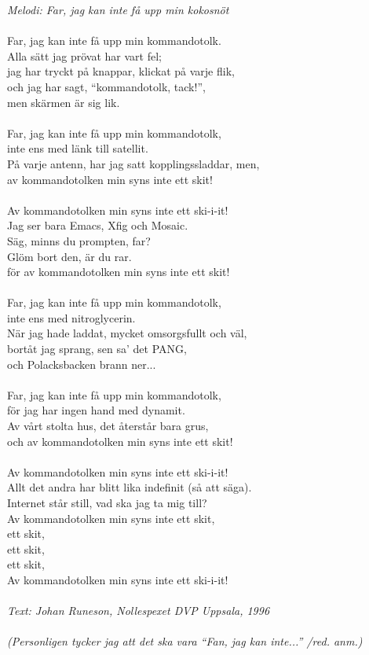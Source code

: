 {\footnotesize\textit{Melodi: Far, jag kan inte få upp min kokosnöt}}\\
\\
Far, jag kan inte få upp min kommandotolk.\\
Alla sätt jag prövat har vart fel;\\
jag har tryckt på knappar, klickat på varje flik,\\
och jag har sagt, “kommandotolk, tack!”,\\
men skärmen är sig lik.\\
\\
Far, jag kan inte få upp min kommandotolk,\\
inte ens med länk till satellit.\\
På varje antenn, har jag satt kopplingssladdar, men,\\
av kommandotolken min syns inte ett skit!\\
\\
Av kommandotolken min syns inte ett ski-i-it!\\
Jag ser bara Emacs, Xfig och Mosaic.\\
Säg, minns du prompten, far?\\
Glöm bort den, är du rar.\\
för av kommandotolken min syns inte ett skit!\\
\\
Far, jag kan inte få upp min kommandotolk,\\
inte ens med nitroglycerin.\\
När jag hade laddat, mycket omsorgsfullt och väl,\\
bortåt jag sprang, sen sa' det PANG,\\
och Polacksbacken brann ner...\\
\\
Far, jag kan inte få upp min kommandotolk,\\
för jag har ingen hand med dynamit.\\
Av vårt stolta hus, det återstår bara grus,\\
och av kommandotolken min syns inte ett skit!\\
\\
Av kommandotolken min syns inte ett ski-i-it!\\
Allt det andra har blitt lika indefinit (så att säga).\\
Internet står still, vad ska jag ta mig till?\\
Av kommandotolken min syns inte ett skit,\\
ett skit,\\
ett skit,\\
ett skit,\\
Av kommandotolken min syns inte ett ski-i-it!\\
\\
{\footnotesize\textit{Text: Johan Runeson, Nollespexet DVP Uppsala,
    1996\\ \\ (Personligen tycker jag att det ska vara ``Fan, jag kan
    inte...'' /red. anm.)}}
